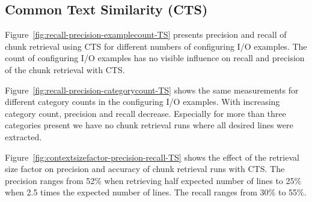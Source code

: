\documentclass[\myrootdir/main.tex]{subfiles}
\begin{document}
\subsection{Common Text Similarity (CTS)}
Figure~\ref{fig:recall-precision-examplecount-TS} presents precision and recall of chunk retrieval using CTS for different numbers of configuring I/O examples.
The count of configuring I/O examples has no visible influence on recall and precision of the chunk retrieval with CTS\@.

Figure~\ref{fig:recall-precision-categorycount-TS} shows the same measurements for different category counts in the configuring I/O examples.
With increasing category count, precision and recall decrease.
Especially for more than three categories present we have no chunk retrieval runs where all desired lines were extracted.

Figure~\ref{fig:contextsizefactor-precision-recall-TS} shows the effect of the retrieval size factor on precision and accuracy of chunk retrieval runs with CTS\@.
The precision ranges from 52\% when retrieving half expected number of lines to 25\% when 2.5 times the expected number of lines.
The recall ranges from 30\% to 55\%.
\end{document}
